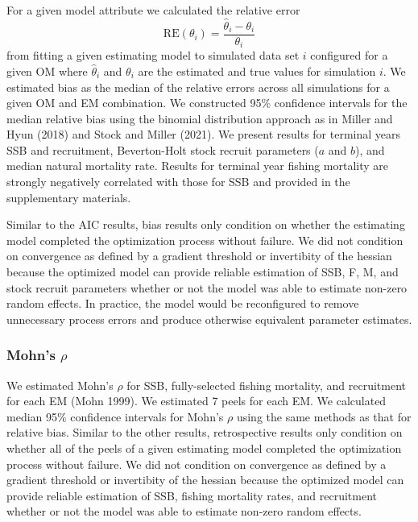 \documentclass[
  12pt,
]{article}
\begin{document}
For a given model attribute we calculated the relative error \[
\text{RE}\left(\theta_i\right) = \frac{\widehat \theta_i - \theta_i}{\theta_i}
\] from fitting a given estimating model to simulated data set \(i\)
configured for a given OM where \(\widehat \theta_i\) and \(\theta_i\)
are the estimated and true values for simulation \(i\). We estimated
bias as the median of the relative errors across all simulations for a
given OM and EM combination. We constructed 95\% confidence intervals
for the median relative bias using the binomial distribution approach as
in Miller and Hyun (2018) and Stock and Miller (2021). We present
results for terminal years SSB and recruitment, Beverton-Holt stock
recruit parameters (\(a\) and \(b\)), and median natural mortality rate.
Results for terminal year fishing mortality are strongly negatively
correlated with those for SSB and provided in the supplementary
materials.

Similar to the AIC results, bias results only condition on whether the
estimating model completed the optimization process without failure. We
did not condition on convergence as defined by a gradient threshold or
invertibity of the hessian because the optimized model can provide
reliable estimation of SSB, F, M, and stock recruit parameters whether
or not the model was able to estimate non-zero random effects. In
practice, the model would be reconfigured to remove unnecessary process
errors and produce otherwise equivalent parameter estimates.

\hypertarget{mohns-rho}{%
\subsubsection*{\texorpdfstring{Mohn's
\(\rho\)}{Mohn's \textbackslash rho}}\label{mohns-rho}}

We estimated Mohn's \(\rho\) for SSB, fully-selected fishing mortality,
and recruitment for each EM (Mohn 1999). We estimated 7 peels for each
EM. We calculated median 95\% confidence intervals for Mohn's \(\rho\)
using the same methods as that for relative bias. Similar to the other
results, retrospective results only condition on whether all of the
peels of a given estimating model completed the optimization process
without failure. We did not condition on convergence as defined by a
gradient threshold or invertibity of the hessian because the optimized
model can provide reliable estimation of SSB, fishing mortality rates,
and recruitment whether or not the model was able to estimate non-zero
random effects.
\end{document}
